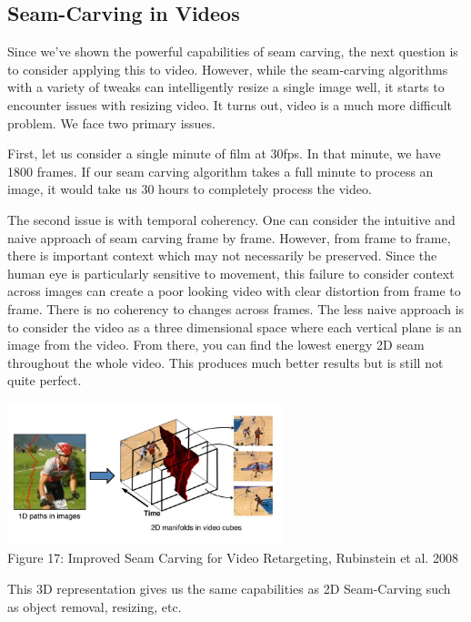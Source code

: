 \documentclass{article}
\begin{document}
\subsection{Seam-Carving in Videos}
Since we've shown the powerful capabilities of seam carving, the next question is to consider applying this to video. However, while the seam-carving algorithms with a variety of tweaks can intelligently resize a single image well, it starts to encounter issues with resizing video. It turns out, video is a much more difficult problem. We face two primary issues. 

First, let us consider a single minute of film at 30fps. In that minute, we have 1800 frames. If our seam carving algorithm takes a full minute to process an image, it would take us 30 hours to completely process the video. 

The second issue is with temporal coherency. One can consider the intuitive and naive approach of seam carving frame by frame. However, from frame to frame, there is important context which may not necessarily be preserved. Since the human eye is particularly sensitive to movement, this failure to consider context across images can create a poor looking video with clear distortion from frame to frame. There is no coherency to changes across frames. The less naive approach is to consider the video as a three dimensional space where each vertical plane is an image from the video. From there, you can find the lowest energy 2D seam throughout the whole video. This produces much better results but is still not quite perfect. 
\begin{center}
\includegraphics[width=8cm]{video_retargeting.JPG} \\
Figure 17: Improved Seam Carving for Video Retargeting, Rubinstein et al. 2008
\end{center}

This 3D representation gives us the same capabilities as 2D Seam-Carving such as object removal, resizing, etc.
\end{document}
